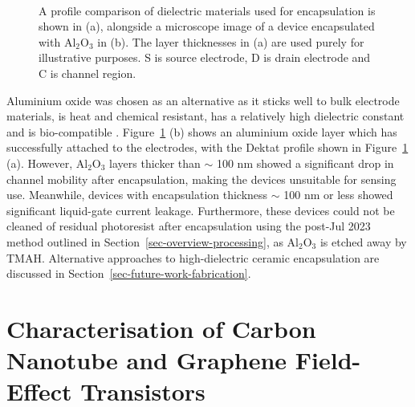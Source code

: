 \documentclass[
  a4paper,
]{scrbook}
\begin{document}
\begin{figure}
\begin{minipage}[t]{0.42\linewidth}
{{}

}

\end{minipage}%
%
\begin{minipage}[t]{0.01\linewidth}

{\centering 

~

}

\end{minipage}%

\caption[A profile comparison of dielectric materials used for
encapsulation, alongside a microscope image of a device encapsulated
with alumina.]{\label{fig-dektat-dielectric-layer}A profile comparison
of dielectric materials used for encapsulation is shown in (a),
alongside a microscope image of a device encapsulated with
Al\(_2\)O\(_3\) in (b). The layer thicknesses in (a) are used purely for
illustrative purposes. S is source electrode, D is drain electrode and C
is channel region.}

\end{figure}

Aluminium oxide was chosen as an alternative as it sticks well to bulk
electrode materials, is heat and chemical resistant, has a relatively
high dielectric constant and is bio-compatible
\autocite{Guarnieri2014,Albarghouthi2022,Kolodzey2000}.
Figure~\ref{fig-dektat-dielectric-layer} (b) shows an aluminium oxide
layer which has successfully attached to the electrodes, with the Dektat
profile shown in Figure~\ref{fig-dektat-dielectric-layer} (a). However,
Al\(_2\)O\(_3\) layers thicker than \(\sim\) 100 nm showed a significant
drop in channel mobility after encapsulation, making the devices
unsuitable for sensing use. Meanwhile, devices with encapsulation
thickness \(\sim\) 100 nm or less showed significant liquid-gate current
leakage. Furthermore, these devices could not be cleaned of residual
photoresist after encapsulation using the post-Jul 2023 method outlined
in Section~\ref{sec-overview-processing}, as Al\(_2\)O\(_3\) is etched
away by TMAH. Alternative approaches to high-dielectric ceramic
encapsulation are discussed in
Section~\ref{sec-future-work-fabrication}.

\hypertarget{characterisation-of-carbon-nanotube-and-graphene-field-effect-transistors}{%
\section{Characterisation of Carbon Nanotube and Graphene Field-Effect
Transistors}\label{characterisation-of-carbon-nanotube-and-graphene-field-effect-transistors}}
\end{document}

